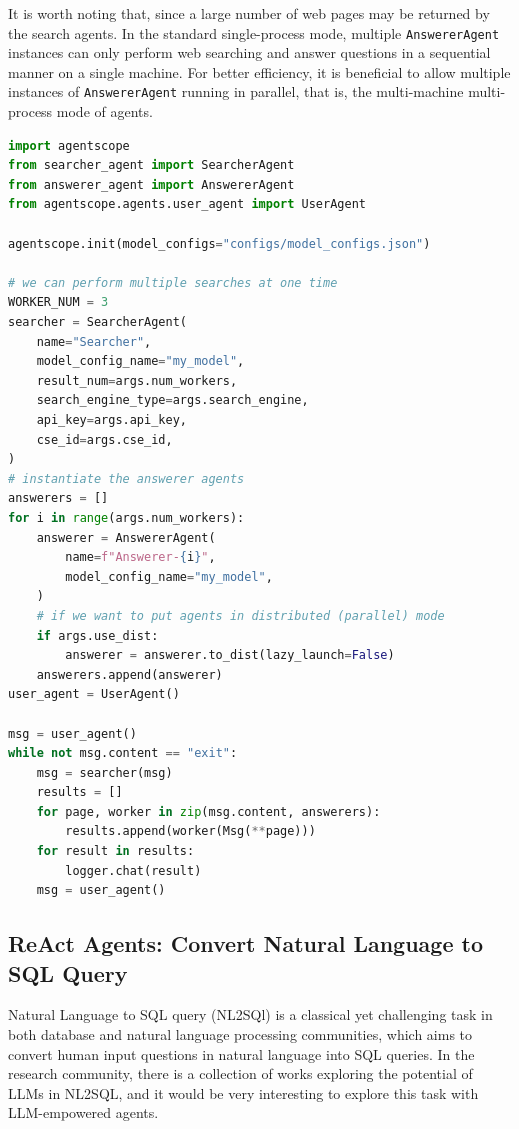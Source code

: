 It is worth noting that, since a large number of web pages may be returned by the search agents. In the standard single-process mode, multiple \texttt{AnswererAgent} instances can only perform web searching and answer questions in a sequential manner on a single machine. For better efficiency, it is beneficial to allow multiple instances of \texttt{AnswererAgent} running in parallel, that is, the multi-machine multi-process mode of \ours agents. 

\begin{lstlisting}[language=Python, caption={Example of utilizing web search and retrieve agents.}, label={lst:search_01}, float=t]
import agentscope
from searcher_agent import SearcherAgent
from answerer_agent import AnswererAgent
from agentscope.agents.user_agent import UserAgent

agentscope.init(model_configs="configs/model_configs.json")

# we can perform multiple searches at one time
WORKER_NUM = 3
searcher = SearcherAgent(
    name="Searcher",
    model_config_name="my_model",
    result_num=args.num_workers,
    search_engine_type=args.search_engine,
    api_key=args.api_key,
    cse_id=args.cse_id,
)
# instantiate the answerer agents
answerers = []
for i in range(args.num_workers):
    answerer = AnswererAgent(
        name=f"Answerer-{i}",
        model_config_name="my_model",
    )
    # if we want to put agents in distributed (parallel) mode
    if args.use_dist:
        answerer = answerer.to_dist(lazy_launch=False)
    answerers.append(answerer)
user_agent = UserAgent()

msg = user_agent()
while not msg.content == "exit":
    msg = searcher(msg)
    results = []
    for page, worker in zip(msg.content, answerers):
        results.append(worker(Msg(**page)))
    for result in results:
        logger.chat(result)
    msg = user_agent()
\end{lstlisting}


\subsection{ReAct Agents: Convert Natural Language to SQL Query}

Natural Language to SQL query (NL2SQl) is a classical yet challenging task in both database and natural language processing communities, which aims to convert human input questions in natural language into SQL queries. In the research community, there is a collection of works exploring the potential of LLMs in NL2SQL, and it would be very interesting to explore this task with LLM-empowered agents.

